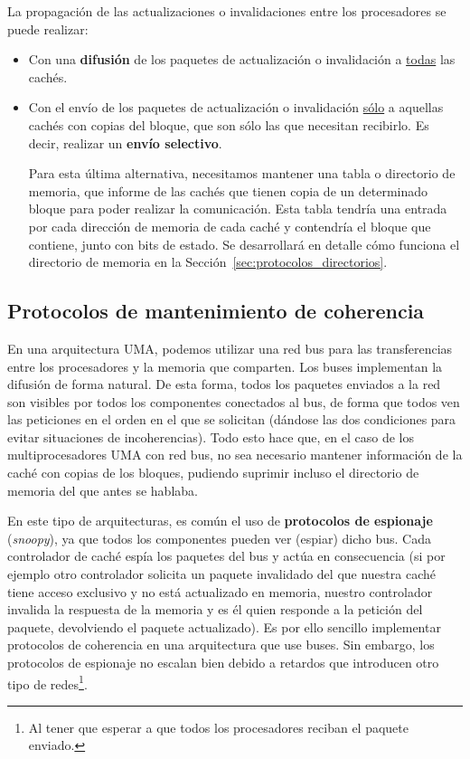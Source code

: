La propagación de las actualizaciones o invalidaciones entre los procesadores se puede realizar:
\begin{itemize}
    \item Con una \textbf{difusión} de los paquetes de actualización o invalidación a \underline{todas} las cachés.
    \item Con el envío de los paquetes de actualización o invalidación \underline{sólo} a aquellas cachés con copias del bloque, que son sólo las que necesitan recibirlo. Es decir, realizar un \textbf{envío selectivo}.

        Para esta última alternativa, necesitamos mantener una tabla o directorio de memoria, que informe de las cachés que tienen copia de un determinado bloque para poder realizar la comunicación. Esta tabla tendría una entrada por cada dirección de memoria de cada caché y contendría el bloque que contiene, junto con bits de estado. Se desarrollará en detalle cómo funciona el directorio de memoria en la Sección~\ref{sec:protocolos_directorios}.
\end{itemize}

\subsection{Protocolos de mantenimiento de coherencia}
En una arquitectura UMA, podemos utilizar una red bus para las transferencias entre los procesadores y la memoria que comparten. Los buses implementan la difusión de forma natural. De esta forma, todos los paquetes enviados a la red son visibles por todos los componentes conectados al bus, de forma que todos ven las peticiones en el orden en el que se solicitan (dándose las dos condiciones para evitar situaciones de incoherencias). Todo esto hace que, en el caso de los multiprocesadores UMA con red bus, no sea necesario mantener información de la caché con copias de los bloques, pudiendo suprimir incluso el directorio de memoria del que antes se hablaba. 

En este tipo de arquitecturas, es común el uso de \textbf{protocolos de espionaje} (\emph{snoopy}), ya que todos los componentes pueden ver (espiar) dicho bus. Cada controlador de caché espía los paquetes del bus y actúa en consecuencia (si por ejemplo otro controlador solicita un paquete invalidado del que nuestra caché tiene acceso exclusivo y no está actualizado en memoria, nuestro controlador invalida la respuesta de la memoria y es él quien responde a la petición del paquete, devolviendo el paquete actualizado). Es por ello sencillo implementar protocolos de coherencia en una arquitectura que use buses. Sin embargo, los protocolos de espionaje no escalan bien debido a retardos que introducen otro tipo de redes\footnote{Al tener que esperar a que todos los procesadores reciban el paquete enviado.}.\\

